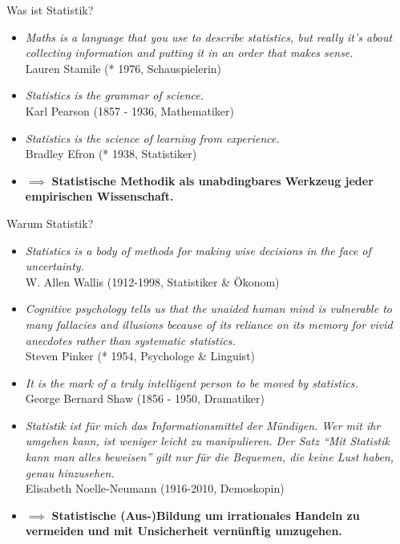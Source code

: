 \documentclass[
  10pt,
  ignorenonframetext,
]{beamer}
\providecommand{\tightlist}{%
  \setlength{\itemsep}{0pt}\setlength{\parskip}{0pt}}
\begin{document}
\begin{frame}{Was ist Statistik?}
\label{was-ist-statistik-1}
\begin{itemize}[<+->]
\tightlist
\item
  \emph{Maths is a language that you use to describe statistics, but
  really it's about collecting information and putting it in an order
  that makes sense.}\\
  Lauren Stamile (* 1976, Schauspielerin)
\item
  \emph{Statistics is the grammar of science.}\\
  Karl Pearson (1857 - 1936, Mathematiker)
\item
  \emph{Statistics is the science of learning from experience.}\\
  Bradley Efron (* 1938, Statistiker)
\end{itemize}

\begin{itemize}[<+->]
\tightlist
\item
  \(\implies\) \textbf{Statistische Methodik als unabdingbares Werkzeug
  jeder empirischen Wissenschaft.}
\end{itemize}
\end{frame}

\begin{frame}{Warum Statistik?}
\label{warum-statistik}
\begin{itemize}[<+->]
\tightlist
\item
  \emph{Statistics is a body of methods for making wise decisions in the
  face of uncertainty.}\\
  W. Allen Wallis (1912-1998, Statistiker \& Ökonom)\\
\item
  \emph{Cognitive psychology tells us that the unaided human mind is
  vulnerable to many fallacies and illusions because of its reliance on
  its memory for vivid anecdotes rather than systematic statistics.}\\
  Steven Pinker (* 1954, Psychologe \& Linguist)
\item
  \emph{It is the mark of a truly intelligent person to be moved by
  statistics.}\\
  George Bernard Shaw (1856 - 1950, Dramatiker)
\item
  \emph{Statistik ist für mich das Informationsmittel der Mündigen. Wer
  mit ihr umgehen kann, ist weniger leicht zu manipulieren. Der Satz
  ``Mit Statistik kann man alles beweisen'' gilt nur für die Bequemen,
  die keine Lust haben, genau hinzusehen.}\\
  Elisabeth Noelle-Neumann (1916-2010, Demoskopin)
\end{itemize}

\begin{itemize}[<+->]
\tightlist
\item
  \(\implies\) \textbf{Statistische (Aus-)Bildung um irrationales
  Handeln zu vermeiden und mit Unsicherheit vernünftig umzugehen.}
\end{itemize}
\end{frame}
\end{document}
